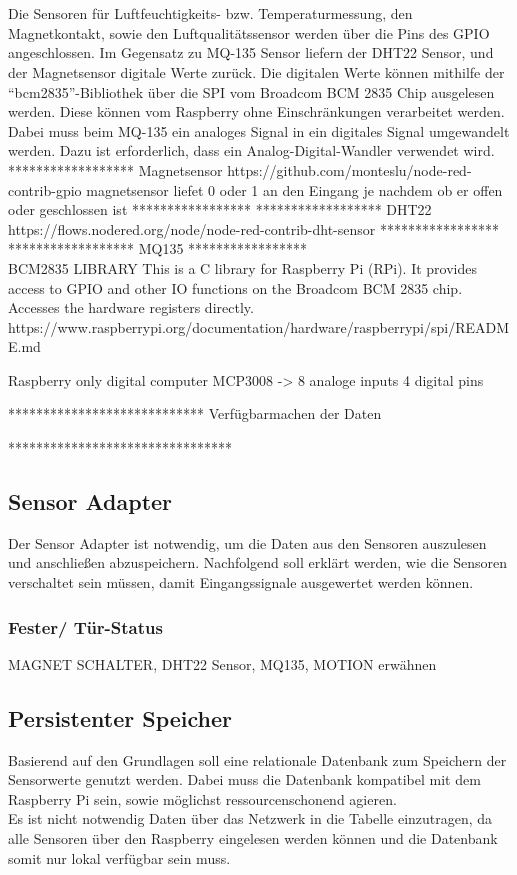 \\\\
Die Sensoren für Luftfeuchtigkeits- bzw. Temperaturmessung, den Magnetkontakt, sowie den Luftqualitätssensor werden über die Pins des \ac{GPIO} angeschlossen. Im Gegensatz zu MQ-135 Sensor liefern der DHT22 Sensor, und der Magnetsensor digitale Werte zurück. Die digitalen Werte können mithilfe der \enquote{bcm2835}-Bibliothek über die SPI vom Broadcom BCM 2835 Chip ausgelesen werden\cite{bcm:Bcm}. Diese können vom Raspberry ohne Einschränkungen verarbeitet werden. Dabei muss beim MQ-135 ein analoges Signal in ein digitales Signal umgewandelt werden. Dazu ist erforderlich, dass ein Analog-Digital-Wandler verwendet wird. 
******************
Magnetsensor https://github.com/monteslu/node-red-contrib-gpio
magnetsensor liefet 0 oder 1 an den Eingang je nachdem ob er offen oder geschlossen ist
*****************
******************
DHT22 https://flows.nodered.org/node/node-red-contrib-dht-sensor
*****************
******************
MQ135
*****************
\\

BCM2835 LIBRARY
This is a C library for Raspberry Pi (RPi). It provides access to GPIO and other IO functions on the Broadcom BCM 2835 chip. Accesses the hardware registers directly.
https://www.raspberrypi.org/documentation/hardware/raspberrypi/spi/README.md

Raspberry only digital computer 
MCP3008 -> 8 analoge inputs 4 digital pins

****************************
Verfügbarmachen der Daten 


********************************

\subsection{Sensor Adapter}
Der Sensor Adapter ist notwendig, um die Daten aus den Sensoren auszulesen und anschließen abzuspeichern. Nachfolgend soll erklärt werden, wie die Sensoren verschaltet sein müssen, damit Eingangssignale ausgewertet werden können. 

\subsubsection{Fester/ Tür-Status}
MAGNET SCHALTER, DHT22 Sensor, MQ135, MOTION erwähnen

\subsection{Persistenter Speicher}
Basierend auf den Grundlagen soll eine relationale Datenbank zum Speichern der Sensorwerte genutzt werden. Dabei muss die Datenbank kompatibel mit dem Raspberry Pi sein, sowie möglichst ressourcenschonend agieren. \\Es ist nicht notwendig Daten über das Netzwerk in die Tabelle einzutragen, da alle Sensoren über den Raspberry eingelesen werden können und die Datenbank somit nur lokal verfügbar sein muss.  

